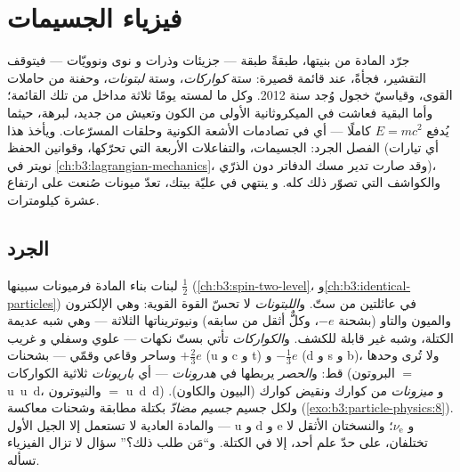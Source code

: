 \chapter{فيزياء الجسيمات}\label{ch:b3:particle-physics}


جرّد المادة من بنيتها، طبقةً طبقة --- جزيئات وذرات و
نوى ونوويّات --- فيتوقف التقشير، فجأةً، عند قائمة قصيرة:
ستة \emph{كواركات}، وستة \emph{لبتونات}، وحفنة من حاملات القوى،
وقياسيّ خجول وُجد سنة 2012. وكل ما لمسته يومًا
ثلاثة مداخل من تلك القائمة؛ وأما البقية فعاشت في الميكروثانية الأولى من
الكون وتعيش من جديد، لبرهة، حيثما يُدفع
$E = mc^2$ كاملًا --- أي في تصادمات الأشعة الكونية وحلقات
المسرّعات. ويأخذ هذا الفصل الجرد: الجسيمات، والتفاعلات
الأربعة التي تحرّكها، وقوانين الحفظ
(أي تيارات نويتر في \cref{ch:b3:lagrangian-mechanics}، وقد صارت تدير
مسك الدفاتر دون الذرّي)، والكواشف التي تصوّر ذلك كله. و
ينتهي في عليّة بيتك، تعدّ ميونات صُنعت على ارتفاع عشرة كيلومترات.

\section{الجرد}

\begin{definition}\label{def:b3:particle-physics:zoo}
لبنات بناء المادة فرميونات سبينها $\tfrac12$
(\cref{ch:b3:spin-two-level}، و\cref{ch:b3:identical-particles}) في
عائلتين من ستّ. و\emph{اللبتونات} لا تحسّ القوة القوية: وهي
الإلكترون والميون والتاو (بشحنة $-e$، وكلٌّ أثقل من سابقه)
ونيوتريناتها الثلاثة --- وهي شبه عديمة الكتلة، وشبه
غير قابلة للكشف. و\emph{الكواركات} تأتي بستّ نكهات --- علوي وسفلي و
غريب وساحر وقاعي وقمّي --- بشحنات $+\tfrac23e$ (u و c و
t) و $-\tfrac13e$ (d و s و b)، ولا تُرى وحدها قط:
و\emph{الحصر} يربطها في \emph{هدرونات} --- أي \emph{باريونات} ثلاثية
الكواركات (البروتون $=$ u~u~d، والنيوترون $=$ u~d~d) و
\emph{ميزونات} من كوارك ونقيض كوارك (البيون والكاون). ولكل جسيم
\emph{جسيم مضادّ} بكتلة مطابقة وشحنات معاكسة
(\cref{exo:b3:particle-physics:8}). والمادة العادية لا تستعمل إلا
الجيل الأول --- u و d و e و $\nu_{\text{e}}$؛ والنسختان الأثقل
لا تختلفان، على حدّ علم أحد، إلا في الكتلة. و``مَن
طلب ذلك؟'' سؤال لا تزال الفيزياء تسأله.
\end{definition}

